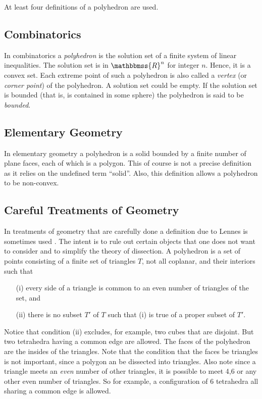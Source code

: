 \documentclass[12pt]{article}
\newcommand{\mathbb}[1]{\mathbbmss{#1}}
\begin{document}
At least four  definitions of a polyhedron are used. 
\subsection*{Combinatorics}
In combinatorics a \emph{polyhedron} is the solution set of a finite system
of linear inequalities. The solution set is in ${\mathbb{R}}^n$ for integer
$n$. Hence, it is a convex set. Each extreme point of such a polyhedron is also called a \emph{vertex} (or \emph{corner point}) of the polyhedron. A solution 
set could be empty. If the solution set is bounded (that is, is contained in
some sphere) the polyhedron is said to be \emph{bounded}.


\subsection*{Elementary Geometry}

In elementary geometry a polyhedron is a  solid bounded by a finite number of plane faces, 
each of which is a polygon.  This of course is not a precise definition as it
relies on the undefined term ``solid''. Also, this definition allows a polyhedron
to be non-convex.

\subsection*{Careful Treatments of Geometry}
In treatments of geometry that are carefully done a definition due to Lennes is 
sometimes used \cite{LE}. The intent is to rule out certain objects that one does not want
to consider and to simplify the theory of dissection.
A polyhedron is a set of points consisting of a finite set of
triangles $T$, not all coplanar,   and their interiors such that
\begin{itemize}
\item[(i)] every side of a triangle is common to an even number of triangles of the
set, and
\item[(ii)] there is no subset $T'$ of $T$ such that (i) is true of a proper subset
of $T'$. 
\end{itemize}
Notice that condition (ii) excludes, for example, two cubes that are disjoint. But two
tetrahedra having a common edge are allowed. The faces of the polyhedron are the insides
of the triangles. Note that the condition that the faces be triangles 
is not important, since a polygon an be dissected into triangles. 
Also note since a triangle meets an \emph{even} number of other triangles,
it is possible to meet 4,6 or any other even number of triangles. So for example,
a configuration of 6 tetrahedra all sharing a common edge is allowed. 
\end{document}
